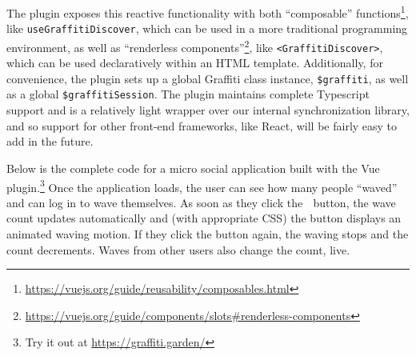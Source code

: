 


The plugin exposes this reactive functionality with both
``composable'' functions\footnote{
  \url{https://vuejs.org/guide/reusability/composables.html}
}, like \texttt{useGraffitiDiscover}, which can be used
in a more traditional programming environment, as well as
``renderless components''\footnote{
  \url{https://vuejs.org/guide/components/slots#renderless-components}
}, like \texttt{<GraffitiDiscover>},
which can be used declaratively within an HTML template.
Additionally, for convenience,
the plugin sets up a global Graffiti class instance, \texttt{\$graffiti},
as well as a global
\texttt{\$graffitiSession}.
The plugin maintains complete Typescript support and
is a relatively light wrapper over our internal synchronization library,
and so support for other front-end frameworks, like React, will be
fairly easy to add in the future.

Below is the complete code for a micro social application built with
the Vue plugin.\footnote{
  Try it out at \url{https://graffiti.garden/}
}
Once the application loads, the user can see how many people ``waved''
and can log in to wave themselves.
As soon as they click the 👋 button, the wave count updates automatically and
(with appropriate CSS) the button displays an animated waving motion.
If they click the button again, the waving stops and the count decrements.
Waves from other users also change the count, live.

